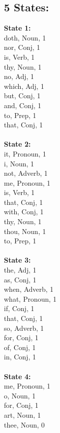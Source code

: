 \begin{multicols}{4}

\section{\textbf{5 States:}}

\textbf{State 1:} \\
doth, Noun, 1\\
nor, Conj, 1\\
is, Verb, 1\\
thy, Noun, 1\\
no, Adj, 1\\
which, Adj, 1\\
but, Conj, 1\\
and, Conj, 1\\
to, Prep, 1\\
that, Conj, 1\\
\\
\textbf{State 2:} \\
it, Pronoun, 1\\
i, Noun, 1\\
not, Adverb, 1\\
me, Pronoun, 1\\
is, Verb, 1\\
that, Conj, 1\\
with, Conj, 1\\
thy, Noun, 1\\
thou, Noun, 1\\
to, Prep, 1\\
\\
\textbf{State 3:} \\
the, Adj, 1\\
as, Conj, 1\\
when, Adverb, 1\\
what, Pronoun, 1\\
if, Conj, 1\\
that, Conj, 1\\
so, Adverb, 1\\
for, Conj, 1\\
of, Conj, 1\\
in, Conj, 1\\
\\
\textbf{State 4:} \\
me, Pronoun, 1\\
o, Noun, 1\\
for, Conj, 1\\
art, Noun, 1\\
thee, Noun, 0\\

\end{multicols}
